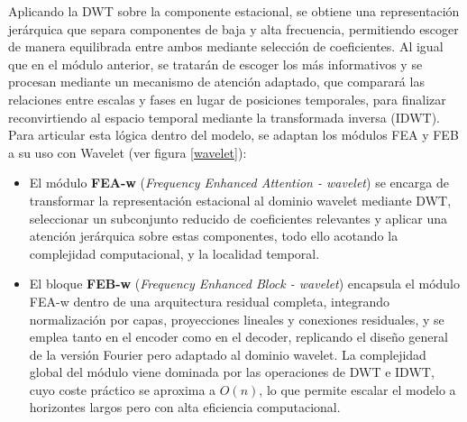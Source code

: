 {Aplicando la DWT sobre la componente estacional, se obtiene una representación jerárquica que separa componentes de baja y alta frecuencia, permitiendo escoger de manera equilibrada entre ambos mediante selección de coeficientes. Al igual que en el módulo anterior, se tratarán de escoger los más informativos y se procesan mediante un mecanismo de atención adaptado, que comparará las relaciones entre escalas y fases en lugar de posiciones temporales, para finalizar reconvirtiendo al espacio temporal mediante la transformada inversa (IDWT).\\

Para articular esta lógica dentro del modelo, se adaptan los módulos FEA y FEB a su uso con Wavelet (ver figura \ref{wavelet}):

\begin{itemize}
    \item El módulo \textbf{FEA-w} (\textit{Frequency Enhanced Attention - wavelet}) se encarga de transformar la representación estacional al dominio wavelet mediante DWT, seleccionar un subconjunto reducido de coeficientes relevantes y aplicar una atención jerárquica sobre estas componentes, todo ello acotando la complejidad computacional, y la localidad temporal.

    \item El bloque \textbf{FEB-w} (\textit{Frequency Enhanced Block - wavelet}) encapsula el módulo FEA-w dentro de una arquitectura residual completa, integrando normalización por capas, proyecciones lineales y conexiones residuales, y se emplea tanto en el encoder como en el decoder, replicando el diseño general de la versión Fourier pero adaptado al dominio wavelet. La complejidad global del módulo viene dominada por las operaciones de DWT e IDWT, cuyo coste práctico se aproxima a $O(n)$, lo que permite escalar el modelo a horizontes largos pero con alta eficiencia computacional.
\end{itemize}

}
